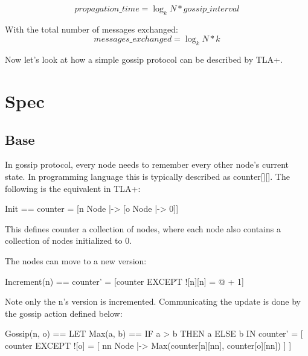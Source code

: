 \documentclass{report}
\begin{document}
\begin{equation} 
    propagation\_time = \log_k N * gossip\_interval
\end{equation}

With the total number of messages exchanged: 
\begin{equation} 
    messages\_exchanged = \log_k N * k
\end{equation}

Now let's look at how a simple gossip protocol can be described by TLA+.

\section{Spec}

\subsection{Base}

In gossip protocol, every node needs to remember every other node's current
state. In programming language this is typically described as counter[][]. The following is
the equivalent in TLA+: 
\begin{tla}
    Init == counter = [n \in Node |-> [o \in Node |-> 0]] 
\end{tla}
\begin{tlatex}
\end{tlatex}

This defines counter a collection of nodes, where each node also contains a
collection of nodes initialized to 0.\newline

The nodes can move to a new version: 
\begin{tla}
    Increment(n) == counter' = [counter EXCEPT ![n][n] = @ + 1]
\end{tla}
\begin{tlatex}
\end{tlatex}
 \newline\newline
Note only the n's version is incremented. Communicating the update is done by
the gossip action defined below:
\begin{tla}
Gossip(n, o) ==                  
    LET Max(a, b) == IF a > b THEN a ELSE b 
    IN counter' = [
        counter EXCEPT ![o] = [
            nn \in Node |->            
                Max(counter[n][nn], counter[o][nn])
            ] 
    ]
\end{tla}
\begin{tlatex}
%
\@x{\@s{16.4} \.{\IN} counter \.{'} \.{=} [}%
\@x{\@s{40.89} counter {\EXCEPT} {\bang} [ o ] \.{=} [}%
%
%
\@x{\@s{57.29} ]}%
\@x{\@s{16.4} ]}%
\end{tlatex}
\end{document}
